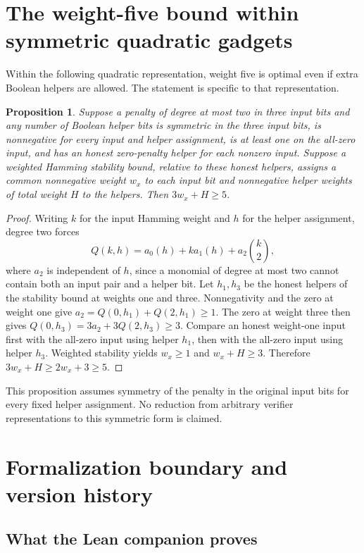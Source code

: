 \documentclass[11pt,letterpaper]{article}
\newtheorem{proposition}[theorem]{Proposition}
\theoremstyle{definition}
\theoremstyle{remark}
\begin{document}
\section{The weight-five bound within symmetric quadratic gadgets}\label{app:gadget-optimality}

Within the following quadratic representation, weight five is optimal
even if extra Boolean helpers are allowed. The statement is specific to
that representation.

\begin{proposition}\label{prop:symmetric-gadget-weight}
Suppose a penalty of degree at most two in three input bits and any
number of Boolean helper bits is symmetric in the three input
bits, is nonnegative for every input and helper assignment, is at
least one on the all-zero input, and has an honest zero-penalty
helper for each nonzero input. Suppose a weighted Hamming stability
bound, relative to these honest helpers, assigns a common nonnegative
weight $w_x$ to each input bit and nonnegative helper weights of total
weight $H$ to the helpers. Then $3w_x+H\ge5$.
\end{proposition}
\begin{proof}
Writing $k$ for the input Hamming weight and $h$ for the helper
assignment, degree two forces
\[
 Q(k,h)=a_0(h)+ka_1(h)+a_2\binom{k}{2},
\]
where $a_2$ is independent of $h$, since a monomial of degree at most
two cannot contain both an input pair and a helper bit. Let $h_1,h_3$ be the honest helpers of the stability bound
at weights one and three. Nonnegativity and the zero at weight one
give
$a_2=Q(0,h_1)+Q(2,h_1)\ge1$.
The zero at weight three then gives
$Q(0,h_3)=3a_2+3Q(2,h_3)\ge3$.
Compare an honest weight-one input first with the all-zero input
using helper $h_1$, then with the all-zero input using helper $h_3$.
Weighted stability yields $w_x\ge1$ and $w_x+H\ge3$.
Therefore $3w_x+H\ge2w_x+3\ge5$.
\end{proof}

This proposition assumes symmetry of the penalty in the original
input bits for every fixed helper assignment. No reduction from
arbitrary verifier representations to this symmetric form is claimed.


\section{Formalization boundary and version history}\label{app:provenance}
\subsection{What the Lean companion proves}\label{app:formal-boundary}
\end{document}
